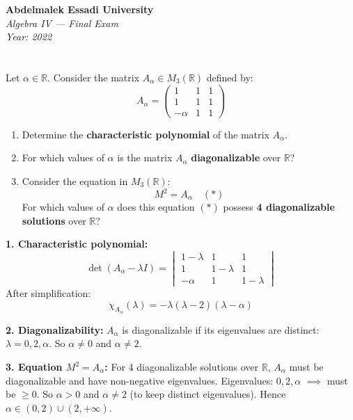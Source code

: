 \documentclass[12pt]{article}
\begin{document}
\begin{center}
  \Large\textbf{Abdelmalek Essadi University} \\[1em]
  \large\textit{Algebra IV — Final Exam} \\[0.5em]
  \large\textit{Year: 2022} \\[2em]
\end{center}

\vspace{0.5cm}

\section{}
Let $\alpha\in\mathbb{R}$. Consider the matrix $A_{\alpha}\in M_{3}(\mathbb{R})$
defined by: 
$$A_{\alpha} = 
\begin{pmatrix} 
    1 & 1 & 1 \\ 
    1 & 1 & 1 \\ 
    -\alpha & 1 & 1 
\end{pmatrix}$$ 

\begin{enumerate} 
    \item Determine the \textbf{characteristic polynomial} of the matrix $A_{\alpha}$. 
    \item For which values of $\alpha$ is the matrix $A_{\alpha}$ \textbf{diagonalizable} over $\mathbb{R}$? 
    \item Consider the equation
in $M_3(\mathbb{R})$: $$M^2 = A_{\alpha} \quad (*)$$ 
For which values of $\alpha$ does this equation $(*)$ possess \textbf{4 diagonalizable
solutions} over $\mathbb{R}$? 
\end{enumerate}

\begin{answerbox}
\textbf{1. Characteristic polynomial:}  
\[
\det(A_\alpha - \lambda I) = 
\begin{vmatrix}
1-\lambda & 1 & 1 \\ 
1 & 1-\lambda & 1 \\ 
-\alpha & 1 & 1-\lambda
\end{vmatrix} 
\]
After simplification:  
\[
\chi_{A_\alpha}(\lambda) = -\lambda(\lambda - 2)(\lambda - \alpha)
\]

\textbf{2. Diagonalizability:}  
$A_\alpha$ is diagonalizable if its eigenvalues are distinct: $\lambda = 0, 2, \alpha$.  
So $\alpha \neq 0$ and $\alpha \neq 2$.  

\textbf{3. Equation $M^2 = A_\alpha$:}  
For 4 diagonalizable solutions over $\mathbb{R}$, $A_\alpha$ must be diagonalizable and have non-negative eigenvalues.  
Eigenvalues: $0,2,\alpha$ $\implies$ must be $\ge 0$. So $\alpha > 0$ and $\alpha \neq 2$ (to keep distinct eigenvalues).  
Hence $\alpha \in (0,2) \cup (2,+\infty)$.
\end{answerbox}
\end{document}

